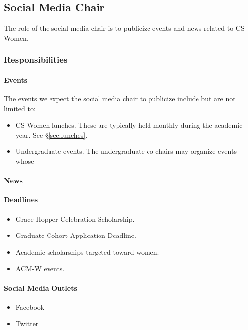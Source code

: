 \subsection{Social Media Chair}
\label{sec:socialmedia}

The role of the social media chair is to publicize events and news related to CS Women. 

\subsubsection{Responsibilities}


\paragraph{Events} The events we expect the social media chair to publicize include but are not limited to:
\begin{itemize}
	\item CS Women lunches. These are typically held monthly during the academic year. See \S\ref{sec:lunches}.
	\item Undergraduate events. The undergraduate co-chairs may organize events whose 
\end{itemize}

\paragraph{News} 

\paragraph{Deadlines}
\begin{itemize}
	\item Grace Hopper Celebration Scholarship.
	\item Graduate Cohort Application Deadline.
	\item Academic scholarships targeted toward women.
	\item ACM-W events.
\end{itemize}

\paragraph{Social Media Outlets} 
\begin{itemize}
	\item Facebook
	\item Twitter
\end{itemize}

